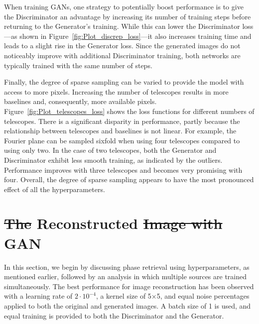 \documentclass[fleqn,usenatbib,twocolumn]{mnras}
\makeatletter
\providecommand{\DIFadd}[1]{{\protect\color{blue}\uwave{#1}}} %
\providecommand{\DIFdel}[1]{{\protect\color{red}\sout{#1}}} %
\providecommand{\DIFaddbegin}{} %
\providecommand{\DIFaddend}{} %
\providecommand{\DIFdelbegin}{} %
\providecommand{\DIFdelend}{} %
\newcommand{\DIFscaledelfig}{0.5}
\newlength{\DIFdelgraphicswidth} %
\newlength{\DIFdelgraphicsheight} %
\newcommand{\DIFaddincludegraphics}[2][]{{\color{blue}\fbox{\DIFOincludegraphics[#1]{#2}}}} %
\newcommand{\DIFdelincludegraphics}[2][]{%
\sbox{\DIFdelgraphicsbox}{\DIFOincludegraphics[#1]{#2}}%
\settoboxwidth{\DIFdelgraphicswidth}{\DIFdelgraphicsbox} %
\settoboxtotalheight{\DIFdelgraphicsheight}{\DIFdelgraphicsbox} %
\scalebox{\DIFscaledelfig}{%
\parbox[b]{\DIFdelgraphicswidth}{\usebox{\DIFdelgraphicsbox}\\[-\baselineskip] \rule{\DIFdelgraphicswidth}{0em}}\llap{\resizebox{\DIFdelgraphicswidth}{\DIFdelgraphicsheight}{%
\setlength{\unitlength}{\DIFdelgraphicswidth}%
\begin{picture}(1,1)%
\thicklines\linethickness{2pt} %
{\color[rgb]{1,0,0}\put(0,0){\framebox(1,1){}}}%
{\color[rgb]{1,0,0}\put(0,0){\line( 1,1){1}}}%
{\color[rgb]{1,0,0}\put(0,1){\line(1,-1){1}}}%
\end{picture}%
}\hspace*{3pt}}} %
} %
\DeclareRobustCommand{\DIFaddbegin}{\DIFOaddbegin \let\includegraphics\DIFaddincludegraphics} %
\DeclareRobustCommand{\DIFaddend}{\DIFOaddend \let\includegraphics\DIFOincludegraphics} %
\DeclareRobustCommand{\DIFdelbegin}{\DIFOdelbegin \let\includegraphics\DIFdelincludegraphics} %
\DeclareRobustCommand{\DIFdelend}{\DIFOaddend \let\includegraphics\DIFOincludegraphics} %
\let\sout@orig\sout %
\renewcommand{\sout}[1]{\ifmmode\text{\sout@orig{\ensuremath{#1}}}\else\sout@orig{#1}\fi} %
\makeatother
\begin{document}
When training GANs, one strategy to potentially boost performance is to give the Discriminator an advantage by increasing its number of training steps before returning to the Generator's training. While this can lower the Discriminator loss—as shown in Figure~\ref{fig:Plot_discrep_loss}—it also increases training time and leads to a slight rise in the Generator loss. Since the generated images do not noticeably improve with additional Discriminator training, both networks are typically trained with the same number of steps.

Finally, the degree of sparse sampling can be varied to provide the model with access to more pixels. Increasing the number of telescopes results in more baselines and, consequently, more available pixels. Figure~\ref{fig:Plot_telescopes_loss} shows the loss functions for different numbers of telescopes. There is a significant disparity in performance, partly because the relationship between telescopes and baselines is not linear. For example, the Fourier plane can be sampled sixfold when using four telescopes compared to using only two. In the case of two telescopes, both the Generator and Discriminator exhibit less smooth training, as indicated by the outliers. Performance improves with three telescopes and becomes very promising with four. Overall, the degree of sparse sampling appears to have the most pronounced effect of all the hyperparameters.
\DIFaddbegin 

\DIFaddend \section{\DIFdelbegin \DIFdel{The }\DIFdelend \DIFaddbegin \DIFadd{Images }\DIFaddend Reconstructed \DIFdelbegin \DIFdel{Image with }\DIFdelend \DIFaddbegin \DIFadd{by the }\DIFaddend GAN}
In this section, we begin by discussing phase retrieval using hyperparameters, as mentioned earlier, followed by an analysis in which multiple sources are trained simultaneously. The best performance for image reconstruction has been observed with a learning rate of \(2 \cdot 10^{-4}\), a kernel size of 5×5, and equal noise percentages applied to both the original and generated images. A batch size of 1 is used, and equal training is provided to both the Discriminator and the Generator.
\end{document}

